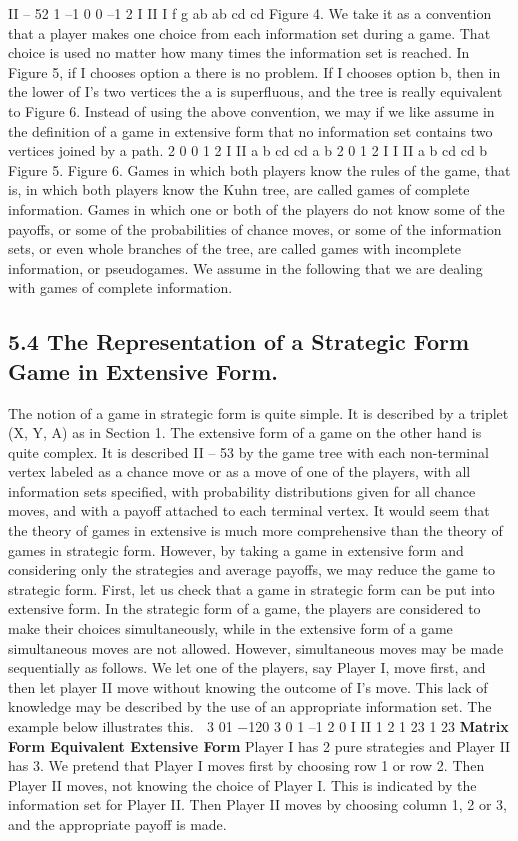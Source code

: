 II – 52
1
–1 0 0 –1
2
I
II
I
f g
ab ab
cd cd
Figure 4.
We take it as a convention that a player makes one choice from each information set
during a game. That choice is used no matter how many times the information set is
reached. In Figure 5, if I chooses option a there is no problem. If I chooses option b, then
in the lower of I’s two vertices the a is superfluous, and the tree is really equivalent to
Figure 6. Instead of using the above convention, we may if we like assume in the definition
of a game in extensive form that no information set contains two vertices joined by a path.
2 0
0 1
2
I
II
a b
cd cd
a b
2 0
1
2
I
I
II
a b
cd cd
b
Figure 5. Figure 6.
Games in which both players know the rules of the game, that is, in which both players
know the Kuhn tree, are called games of complete information. Games in which one or
both of the players do not know some of the payoffs, or some of the probabilities of chance
moves, or some of the information sets, or even whole branches of the tree, are called
games with incomplete information, or pseudogames. We assume in the following
that we are dealing with games of complete information.
\subsection{5.4 The Representation of a Strategic Form Game in Extensive Form.} The
notion of a game in strategic form is quite simple. It is described by a triplet (X, Y, A) as in
Section 1. The extensive form of a game on the other hand is quite complex. It is described
II – 53
by the game tree with each non-terminal vertex labeled as a chance move or as a move
of one of the players, with all information sets specified, with probability distributions
given for all chance moves, and with a payoff attached to each terminal vertex. It would
seem that the theory of games in extensive is much more comprehensive than the theory
of games in strategic form. However, by taking a game in extensive form and considering
only the strategies and average payoffs, we may reduce the game to strategic form.
First, let us check that a game in strategic form can be put into extensive form. In the
strategic form of a game, the players are considered to make their choices simultaneously,
while in the extensive form of a game simultaneous moves are not allowed. However,
simultaneous moves may be made sequentially as follows. We let one of the players, say
Player I, move first, and then let player II move without knowing the outcome of I’s move.
This lack of knowledge may be described by the use of an appropriate information set.
The example below illustrates this.
 3 01
−120
3 0 1 –1 2 0
I
II
1 2
1 23 1 23
\noindent \textbf{Matrix Form Equivalent Extensive Form}
Player I has 2 pure strategies and Player II has 3. We pretend that Player I moves first by
choosing row 1 or row 2. Then Player II moves, not knowing the choice of Player I. This is
indicated by the information set for Player II. Then Player II moves by choosing column
1, 2 or 3, and the appropriate payoff is made.
